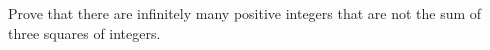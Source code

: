 Prove that there are infinitely many positive integers that are not the sum of three squares of integers.
